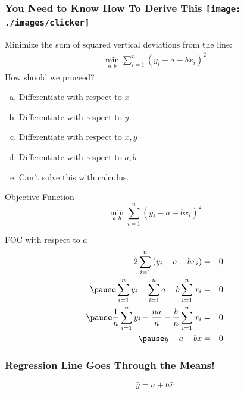 \begin{frame}
\frametitle{You Need to Know How To Derive This \hfill \texttt{[image: ./images/clicker]}}
\alert{Minimize the sum of squared vertical deviations from the line:}
\begin{eqnarray*}
\min_{a,b}  \sum_{i=1}^n (y_i - a - b x_i)^2
\end{eqnarray*}
How should we proceed?
\begin{enumerate}[(a)]
	\item Differentiate with respect to $x$
	\item Differentiate with respect to $y$
	\item Differentiate with respect to $x,y$
	\item Differentiate with respect to $a,b$
	\item Can't solve this with calculus.
\end{enumerate}
\end{frame}
\begin{frame}
\begin{block}{Objective Function}
$$\displaystyle \min_{a,b}  \sum_{i=1}^n (y_i - a - b x_i)^2$$
\end{block}
\begin{block}{FOC with respect to $a$}\pause
\begin{eqnarray*}
	-2 \sum_{i=1}^n\left(y_i - a -bx_i\right) &=& 0 \\\pause
	\sum_{i=1}^n y_i - \sum_{i=1}^n a - b\sum_{i=1}^n x_i &=& 0 \\\pause
	\frac{1}{n} \sum_{i=1}^n y_i - \frac{na}{n} -  \frac{b}{n} \sum_{i=1}^n x_i &=& 0\\\pause
	\bar{y} - a - b\bar{x} &=& 0
\end{eqnarray*}
\end{block}
\end{frame}
\begin{frame}

\frametitle{Regression Line Goes Through the Means!}
 \Huge
\begin{equation*}\boxed{\bar{y} = a + b\bar{x}}\end{equation*}
\normalsize
\end{frame}
